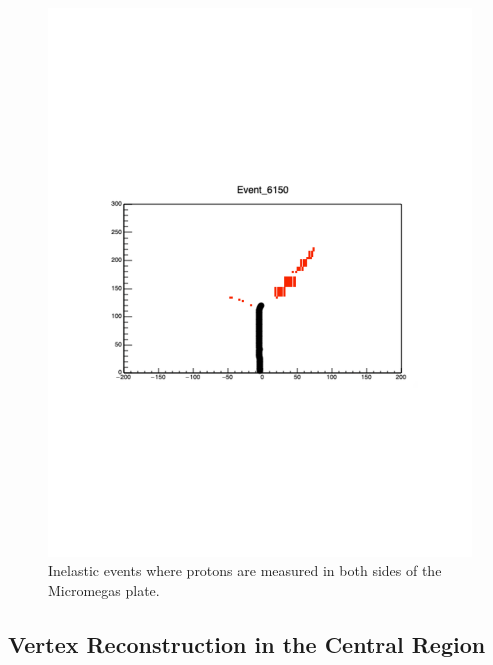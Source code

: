 \documentclass[final,number,sort&compress,5p,times,twocolumn]{elsarticle}
\begin{document}
\begin{figure}[hbt!]
   	  \includegraphics[width=\linewidth]{figures/9C_Inelastic_Event_2}

	\caption{Inelastic events where protons are measured in both sides of the Micromegas plate.}
	
	\label{fig:9C_Inelastic_Side}
	
\end{figure}

\subsection{Vertex Reconstruction in the Central Region}
\end{document}
